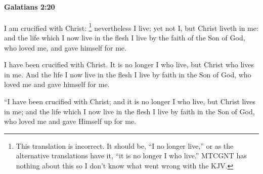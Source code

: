 		\paragraph{Galatians 2:20} %
			\label{GALATIANS-2-20}

			I am crucified with Christ:
				\footnote{%
					This translation is incorrect. It should be, ``I no longer live,'' or as the alternative translations have it, ``it is no longer I who live.'' MTCGNT has nothing about this so I don't know what went wrong with the KJV.
					}%
			nevertheless I live; yet not I, but Christ liveth in me: and the life which I now live in the flesh I live by the faith of the Son of God, who loved me, and gave himself for me.

			\begin{framed}
			\scriptsize
				\begin{compactdesc}
					\item[SBLG] 
					\item[ESV] I have been crucified with Christ. It is no longer I who live, but Christ who lives in me. And the life I now live in the flesh I live by faith in the Son of God, who loved me and gave himself for me.
					\item[NASB] ``I have been crucified with Christ; and it is no longer I who live, but Christ lives in me; and the life which I now live in the flesh I live by faith in the Son of God, who loved me and gave Himself up for me.
				\end{compactdesc}
			\end{framed}

